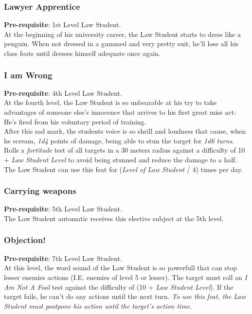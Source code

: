 \documentclass[ letterpaper,12pt]{article}
\begin{document}
\subsubsection{Lawyer Apprentice}
{\bf Pre-requisite}: 1st Level Law Student.\\
  At the beginning of his university career, the Law Student starts to dress like a penguin. When not dressed in a gummed and very pretty suit, he'll lose all his class feats until dresses himself adequate once again.

\subsubsection{I am Wrong}
{\bf Pre-requisite}: 4th Level Law Student.\\
At the fourth level, the Law Student is so unbearable at his try to take advantages of someone else's innocence that arrives to his first great miss act: He's fired from his voluntary period of training.\\
After this sad mark, the students voice is so shrill and loudness that cause, when he scream, {\it 1d4} points of damage, being able to stun the target for {\it 1d6 turns}. Rolls a {\it fortitude} test of all targets in a 30 meters radius against a difficulty of 10 + {\it Law Student Level} to avoid being stunned and reduce the damage to a half.\\
The Law Student can use this feat for ({\it Level of Law Student} / 4) times per day.

\subsubsection{Carrying weapons}
{\bf Pre-requisite}: 5th Level Law Student.\\
The Law Student automatic receives this elective subject at the 5th level.

\subsubsection{Objection!}
{\bf Pre-requisite}: 7th Level Law Student.\\
At this level, the word sound of the Law Student is so powerfull that can stop lesser enemies actions (I.E. enemies of level 5 or lesser). The target must roll an {\it I Am Not A Fool} test against the difficulty of (10 + {\it Law Student Level}). If the target fails, he can't do any actions until the next turn. {\it To use this feat, the Law Student must postpone his action until the target's action time}.
\end{document}
